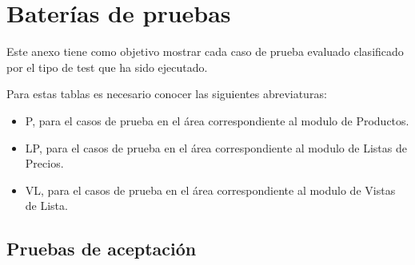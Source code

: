 \chapter{Baterías de pruebas}
Este anexo tiene como objetivo mostrar cada caso de prueba evaluado clasificado
por el tipo de test que ha sido ejecutado.

Para estas tablas es necesario conocer las siguientes abreviaturas:

\begin{itemize}
\item P, para el casos de prueba en el área correspondiente al modulo de Productos.
\item LP, para el casos de prueba en el área correspondiente al modulo de Listas de Precios.
\item VL, para el casos de prueba en el área correspondiente al modulo de Vistas de Lista.
\end{itemize}

\section{Pruebas de aceptación}

